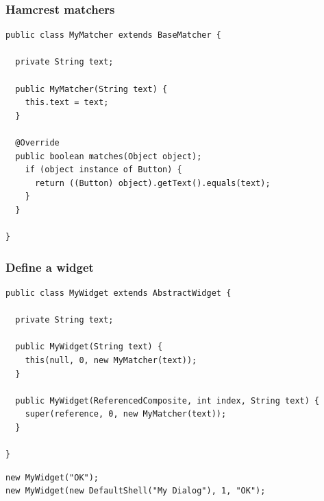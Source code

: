 \documentclass{beamer}
\begin{document}
\begin{frame}[fragile]
\begin{center}
\end{center}
\end{frame}

\begin{frame}[fragile]
\frametitle{Hamcrest matchers}
\begin{lstlisting}
public class MyMatcher extends BaseMatcher {

  private String text;

  public MyMatcher(String text) {
    this.text = text;
  }
  
  @Override
  public boolean matches(Object object);
    if (object instance of Button) {
      return ((Button) object).getText().equals(text);
    }
  }

} 
\end{lstlisting}
\end{frame}

\begin{frame}[fragile]
\frametitle{Define a widget}
\begin{lstlisting}
public class MyWidget extends AbstractWidget {

  private String text;

  public MyWidget(String text) {
    this(null, 0, new MyMatcher(text));
  }

  public MyWidget(ReferencedComposite, int index, String text) {
    super(reference, 0, new MyMatcher(text));
  }

}
\end{lstlisting}
\begin{lstlisting}
new MyWidget("OK");
new MyWidget(new DefaultShell("My Dialog"), 1, "OK");  
\end{lstlisting}
\end{frame}
\end{document}
